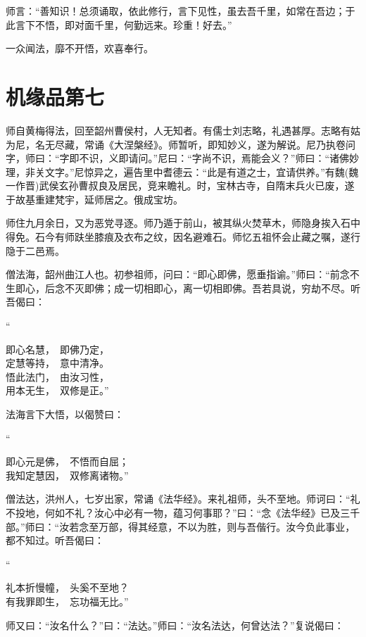 \documentclass[UTF8, 11pt, oneside]{ctexart}
\newenvironment{jizi}[1]{
    \vspace{-1em}\begin{center}
        #1%
        \begin{varwidth}[t]{\linewidth}
}{
        \end{varwidth}
    \end{center}
}
\begin{document}
师言：“善知识！总须诵取，依此修行，言下见性，虽去吾千里，如常在吾边；于此言下不悟，即对面千里，何勤远来。珍重！好去。”

一众闻法，靡不开悟，欢喜奉行。



\section*{机缘品第七}

师自黄梅得法，回至韶州曹侯村，人无知者。有儒士刘志略，礼遇甚厚。志略有姑为尼，名无尽藏，常诵《大涅槃经》。师暂听，即知妙义，遂为解说。尼乃执卷问字，师曰：“字即不识，义即请问。”尼曰：“字尚不识，焉能会义？”师曰：“诸佛妙理，非关文字。”尼惊异之，遍告里中耆德云：“此是有道之士，宜请供养。”有魏(魏一作晋)武侯玄孙曹叔良及居民，竞来瞻礼。时，宝林古寺，自隋末兵火已废，遂于故基重建梵宇，延师居之。俄成宝坊。

师住九月余日，又为恶党寻逐。师乃遁于前山，被其纵火焚草木，师隐身挨入石中得免。石今有师趺坐膝痕及衣布之纹，因名避难石。师忆五祖怀会止藏之嘱，遂行隐于二邑焉。

僧法海，韶州曲江人也。初参祖师，问曰：“即心即佛，愿垂指谕。”师曰：“前念不生即心，后念不灭即佛；成一切相即心，离一切相即佛。吾若具说，穷劫不尽。听吾偈曰：

\begin{jizi}{“}
    即心名慧，　即佛乃定， \\
    定慧等持，　意中清净。 \\
    悟此法门，　由汝习性， \\
    用本无生，　双修是正。”
\end{jizi}

法海言下大悟，以偈赞曰：

\begin{jizi}{“}
    即心元是佛，　不悟而自屈； \\
    我知定慧因，　双修离诸物。”
\end{jizi}

僧法达，洪州人，七岁出家，常诵《法华经》。来礼祖师，头不至地。师诃曰：“礼不投地，何如不礼？汝心中必有一物，蕴习何事耶？”曰：“念《法华经》已及三千部。”师曰：“汝若念至万部，得其经意，不以为胜，则与吾偕行。汝今负此事业，都不知过。听吾偈曰：

\begin{jizi}{“}
    礼本折慢幢，　头奚不至地？ \\
    有我罪即生，　忘功福无比。”
\end{jizi}

师又曰：“汝名什么？”曰：“法达。”师曰：“汝名法达，何曾达法？”复说偈曰：
\end{document}
